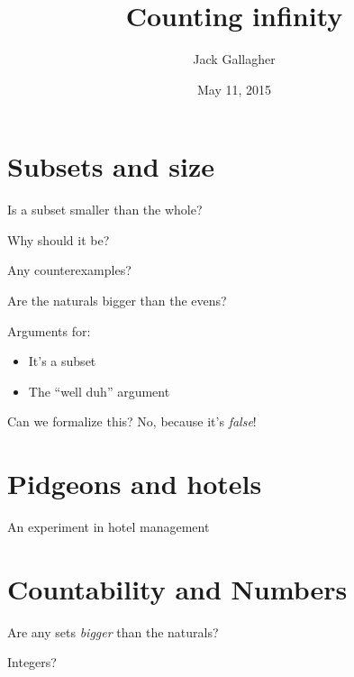 \documentclass[xcolor=svgnames]{beamer}
\title
  [Counting infinity\hspace{2em}]
  {Counting infinity}
\author
  [Jack Gallagher]
  {Jack Gallagher}
\date{May 11, 2015}
\institute{Mentoring Academy}
\begin{document}
\maketitle

\section{Subsets and size}

\begin{frame}{}
  Is a subset smaller than the whole? \pause

  Why should it be? \pause

  Any counterexamples?
\end{frame}

\begin{frame}{}
  Are the naturals bigger than the evens? \pause

  Arguments for:
  \begin{itemize}
    \item It's a subset \pause
    \item The ``well duh'' argument \pause
  \end{itemize}

  Can we formalize this? \pause No, because it's \emph{false}!
\end{frame}

\section{Pidgeons and hotels}

\begin{frame}{}
  \begin{center}
    \Huge An experiment in hotel management
  \end{center}
\end{frame}

\section{Countability and Numbers}

\begin{frame}{}
  \begin{center}
    \Huge Are any sets \emph{bigger} than the naturals?
  \end{center}
\end{frame}

\begin{frame}{}
  \begin{center}
    \Huge Integers?
  \end{center}
\end{frame}
\end{document}
